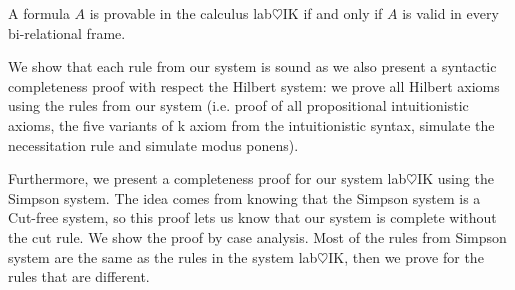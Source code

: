 \documentclass[twoside]{aiml18}
\begin{document}
\begin{theorem}
A formula $A$ is provable in the calculus lab$\heartsuit$IK if and only if $A$ is valid in every bi-relational frame.
\end{theorem}

We show that each rule from our system is sound as we also present a syntactic completeness proof with respect the Hilbert system: we prove all Hilbert axioms using the rules from our system (i.e. proof of all propositional intuitionistic axioms, the five variants of k axiom from the intuitionistic syntax, simulate the necessitation rule and simulate modus ponens). 

Furthermore, we present a completeness proof for our system lab$\heartsuit$IK using the Simpson system. The idea comes from knowing that the Simpson system is a Cut-free system, so this proof lets us know that our system is complete without the cut rule. We show the proof by case analysis. Most of the rules from Simpson system are the same as the rules in the system lab$\heartsuit$IK, then we prove for the rules that are different.
\end{document}
